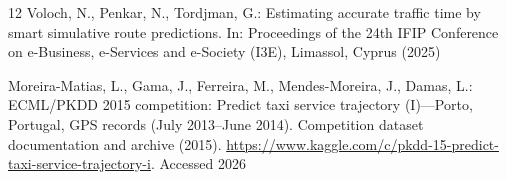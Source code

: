 \begin{thebibliography}{12}
Voloch, N., Penkar, N., Tordjman, G.:
Estimating accurate traffic time by smart simulative route predictions.
In: Proceedings of the 24th IFIP Conference on e-Business, e-Services and e-Society (I3E), Limassol, Cyprus (2025)

Moreira-Matias, L., Gama, J., Ferreira, M., Mendes-Moreira, J., Damas, L.:
ECML/PKDD 2015 competition: Predict taxi service trajectory (I)---Porto, Portugal, GPS records (July 2013--June 2014).
Competition dataset documentation and archive (2015).
\url{https://www.kaggle.com/c/pkdd-15-predict-taxi-service-trajectory-i}.
Accessed 2026

\end{thebibliography}
